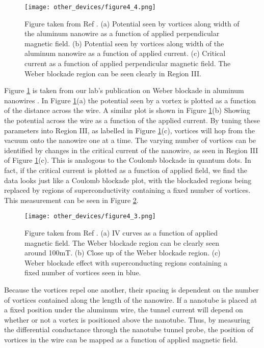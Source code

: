 \begin{figure}
    \centering
    \texttt{[image: other\_devices/figure4\_4.png]}
    \caption{Figure taken from Ref \cite{Morgan-Wall2015}. (a) Potential seen by vortices along width of the aluminum nanowire as a function of applied perpendicular magnetic field. (b) Potential seen by vortices along width of the aluminum nanowire as a function of applied current. (c) Critical current as a function of applied perpendicular magnetic field. The Weber blockade region can be seen clearly in Region III.}
    \label{fig:aluminum_potential}
\end{figure}

Figure \ref{fig:aluminum_potential} is taken from our lab's publication on Weber blockade in aluminum nanowires \cite{Morgan-Wall2015}. In Figure \ref{fig:aluminum_potential}(a) the potential seen by a vortex is plotted as a function of the distance across the wire. A similar plot is shown in Figure \ref{fig:aluminum_potential}(b) Showing the potential across the wire as a function of the applied current. By tuning these parameters into Region III, as labelled in Figure \ref{fig:aluminum_potential}(c), vortices will hop from the vacuum onto the nanowire one at a time. The varying number of vortices can be identified by changes in the critical current of the nanowire, as seen in Region III of Figure \ref{fig:aluminum_potential}(c). This is analogous to the Coulomb blockade in quantum dots. In fact, if the critical current is plotted as a function of applied field, we find the data looks just like a Coulomb blockade plot, with the blockaded regions being replaced by regions of superconductivity containing a fixed number of vortices. This measurement can be seen in Figure \ref{fig:weber_measurement}.

\begin{figure}
    \centering
    \texttt{[image: other\_devices/figure4\_3.png]}
    \caption{Figure taken from Ref \cite{Morgan-Wall2015}. (a) IV curves as a function of applied magnetic field. The Weber blockade region can be clearly seen around 100mT. (b) Close up of the Weber blockade region. (c) Weber blockade effect with superconducting regions containing a fixed number of vortices seen in blue.}
    \label{fig:weber_measurement}
\end{figure}

Because the vortices repel one another, their spacing is dependent on the number of vortices contained along the length of the nanowire. If a nanotube is placed at a fixed position under the aluminum wire, the tunnel current will depend on whether or not a vortex is positioned above the nanotube. Thus, by measuring the differential conductance through the nanotube tunnel probe, the position of vortices in the wire can be mapped as a function of applied magnetic field.

